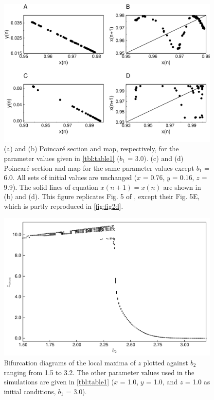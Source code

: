 \newpage

\begin{figure}
  \centering
  \includegraphics[scale=0.7]{figures/fig5.pdf}
  \caption{(a) and (b) Poincaré section and map, respectively, for the parameter values given in \autoref{tbl:table1} ($b_1$ = 3.0).  (c) and (d) Poincaré section and map for the same parameter values except $b_1$ = 6.0. All sets of initial values are unchanged ($x$ = 0.76, $y$ = 0.16, $z$ = 9.9). The solid lines of equation $x(n+1) = x(n)$ are shown in (b) and (d). This figure replicates Fig. 5 of \citet{hastings1991}, except their Fig. 5E, which is partly reproduced in \autoref{fig:fig2d}.}
  \label{fig:fig5}
\end{figure}

\newpage

\begin{figure}
  \centering
  \includegraphics[scale=0.7]{figures/figS1.pdf}
  \caption{Bifurcation diagrams of the local maxima of $z$ plotted against $b_2$ ranging from 1.5 to 3.2. The other parameter values used in the simulations are given in \autoref{tbl:table1} ($x$ = 1.0, $y$ = 1.0, and $z$ = 1.0 as initial conditions, $b_1$ = 3.0).}
  \label{fig:figS1}
\end{figure}
